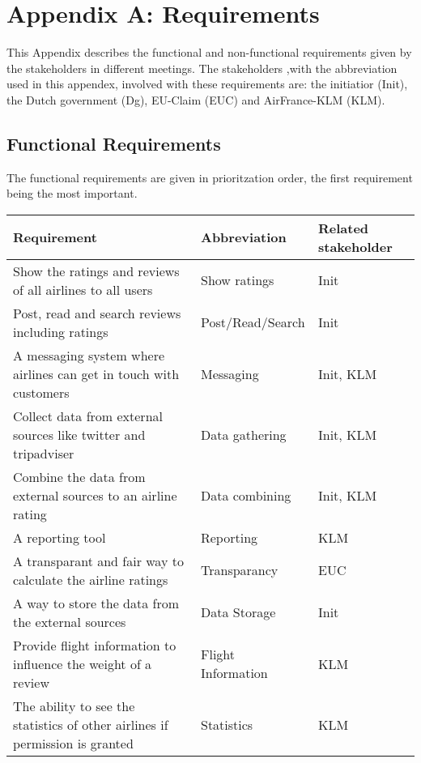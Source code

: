 \section{Appendix A: Requirements}
This Appendix describes the functional and non-functional requirements given by the stakeholders in different meetings. The stakeholders ,with the abbreviation used in this appendex, involved with these requirements are: the initiatior (Init), the Dutch government (Dg), EU-Claim (EUC) and AirFrance-KLM (KLM). 

\subsection*{Functional Requirements}
The functional requirements are given in prioritzation order, the first requirement being the most important. 

\begin{longtable}{| p{10cm}| l | l |}
\hline
\textbf{Requirement} & \textbf{Abbreviation} & \textbf{Related stakeholder} \\ \hline
Show the ratings and reviews of all airlines to all users & Show ratings & Init \\ \hline
Post, read and search reviews including ratings & Post/Read/Search & Init \\ \hline
A messaging system where airlines can get in touch with customers & Messaging & Init, KLM\\ \hline
Collect data from external sources like twitter and tripadviser & Data gathering &Init, KLM \\ \hline
Combine the data from external sources to an airline rating & Data combining &Init, KLM \\ \hline
A reporting tool & Reporting & KLM \\ \hline
A transparant and fair way to calculate the airline ratings & Transparancy & EUC \\ \hline
A way to store the data from the external sources & Data Storage & Init \\ \hline
Provide flight information to influence the weight of a review & Flight Information & KLM  \\ \hline
The ability to see the statistics of other airlines if permission is granted & Statistics & KLM \\ \hline 

\end{longtable}

